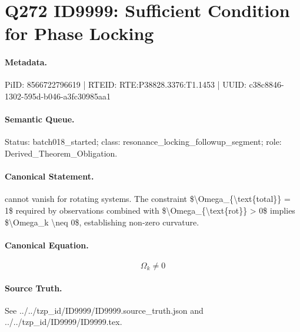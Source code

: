 \section*{Q272 ID9999: Sufficient Condition for Phase Locking}
\paragraph{Metadata.}
PiID: 8566722796619 | RTEID: RTE:P38828.3376:T1.1453 | UUID: c38c8846-1302-595d-b046-a3fc30985aa1

\paragraph{Semantic Queue.}
Status: batch018\_started; class: resonance\_locking\_followup\_segment; role: Derived\_Theorem\_Obligation.

\paragraph{Canonical Statement.}
cannot vanish for rotating systems. The constraint \$\textbackslash{}Omega\_\{\textbackslash{}text\{total\}\} = 1\$ required by observations combined with \$\textbackslash{}Omega\_\{\textbackslash{}text\{rot\}\} > 0\$ implies \$\textbackslash{}Omega\_k \textbackslash{}neq 0\$, establishing non-zero curvature.

\paragraph{Canonical Equation.}
\[
\Omega_k \neq 0
\]

\paragraph{Source Truth.}
See ../../tzp\_id/ID9999/ID9999.source\_truth.json and ../../tzp\_id/ID9999/ID9999.tex.

